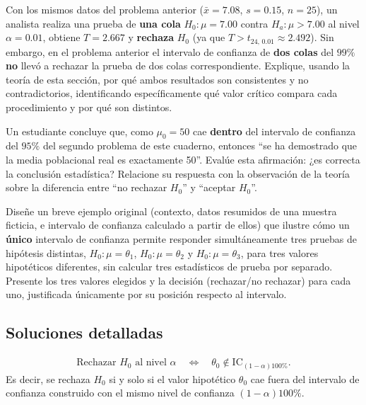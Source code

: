 \begin{problema}
	\label{prob:6517bf1}
	Con los mismos datos del problema anterior ($\bar{x} = 7.08$, $s = 0.15$, $n = 25$), un analista realiza una prueba de \textbf{una cola} $H_0: \mu = 7.00$ contra $H_a: \mu > 7.00$ al nivel $\alpha = 0.01$, obtiene $T = 2.667$ y \textbf{rechaza} $H_0$ (ya que $T > t_{24,\,0.01} \approx 2.492$). Sin embargo, en el problema anterior el intervalo de confianza de \textbf{dos colas} del $99\%$ \textbf{no} llevó a rechazar la prueba de dos colas correspondiente. Explique, usando la teoría de esta sección, por qué ambos resultados son consistentes y no contradictorios, identificando específicamente qué valor crítico compara cada procedimiento y por qué son distintos.
\end{problema}

\begin{problema}
	\label{prob:4f1ea6b}
	Un estudiante concluye que, como $\mu_0 = 50$ cae \textbf{dentro} del intervalo de confianza del $95\%$ del segundo problema de este cuaderno, entonces ``se ha demostrado que la media poblacional real es exactamente 50''. Evalúe esta afirmación: ¿es correcta la conclusión estadística? Relacione su respuesta con la observación de la teoría sobre la diferencia entre ``no rechazar $H_0$'' y ``aceptar $H_0$''.
\end{problema}

\begin{problema}
	\label{prob:1e58b99}
	Diseñe un breve ejemplo original (contexto, datos resumidos de una muestra ficticia, e intervalo de confianza calculado a partir de ellos) que ilustre cómo un \textbf{único} intervalo de confianza permite responder simultáneamente tres pruebas de hipótesis distintas, $H_0: \mu = \theta_1$, $H_0: \mu = \theta_2$ y $H_0: \mu = \theta_3$, para tres valores hipotéticos diferentes, sin calcular tres estadísticos de prueba por separado. Presente los tres valores elegidos y la decisión (rechazar/no rechazar) para cada uno, justificada únicamente por su posición respecto al intervalo.
\end{problema}

\subsection*{Soluciones detalladas}

\begin{solproblema}
	\begin{align}
		\text{Rechazar } H_0 \text{ al nivel } \alpha \quad \Longleftrightarrow \quad \theta_0 \notin \text{IC}_{(1-\alpha)100\%}.
	\end{align}
	Es decir, se rechaza $H_0$ si y solo si el valor hipotético $\theta_0$ cae fuera del intervalo de confianza construido con el mismo nivel de confianza $(1-\alpha)100\%$.
\end{solproblema}

